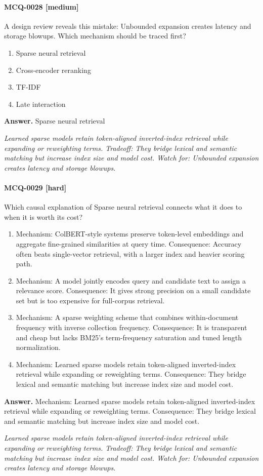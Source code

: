 \paragraph{MCQ-0028 [medium]} A design review reveals this mistake: Unbounded expansion creates latency and storage blowups. Which mechanism should be traced first?
\begin{enumerate}[label=\Alph*.]
\item Sparse neural retrieval
\item Cross-encoder reranking
\item TF-IDF
\item Late interaction
\end{enumerate}
\noindent\textbf{Answer.} Sparse neural retrieval
\par\textit{Learned sparse models retain token-aligned inverted-index retrieval while expanding or reweighting terms. Tradeoff: They bridge lexical and semantic matching but increase index size and model cost. Watch for: Unbounded expansion creates latency and storage blowups.}
\paragraph{MCQ-0029 [hard]} Which causal explanation of Sparse neural retrieval connects what it does to when it is worth its cost?
\begin{enumerate}[label=\Alph*.]
\item Mechanism: ColBERT-style systems preserve token-level embeddings and aggregate fine-grained similarities at query time. Consequence: Accuracy often beats single-vector retrieval, with a larger index and heavier scoring path.
\item Mechanism: A model jointly encodes query and candidate text to assign a relevance score. Consequence: It gives strong precision on a small candidate set but is too expensive for full-corpus retrieval.
\item Mechanism: A sparse weighting scheme that combines within-document frequency with inverse collection frequency. Consequence: It is transparent and cheap but lacks BM25's term-frequency saturation and tuned length normalization.
\item Mechanism: Learned sparse models retain token-aligned inverted-index retrieval while expanding or reweighting terms. Consequence: They bridge lexical and semantic matching but increase index size and model cost.
\end{enumerate}
\noindent\textbf{Answer.} Mechanism: Learned sparse models retain token-aligned inverted-index retrieval while expanding or reweighting terms. Consequence: They bridge lexical and semantic matching but increase index size and model cost.
\par\textit{Learned sparse models retain token-aligned inverted-index retrieval while expanding or reweighting terms. Tradeoff: They bridge lexical and semantic matching but increase index size and model cost. Watch for: Unbounded expansion creates latency and storage blowups.}
